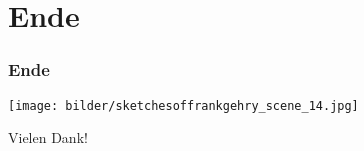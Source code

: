 \documentclass[12pt]{beamer}
\begin{document}
\section{Ende}

\begin{frame}
\frametitle{Ende}
\begin{center}
\texttt{[image: bilder/sketchesoffrankgehry\_scene\_14.jpg]}
\end{center}
Vielen Dank!
\end{frame}








% 
\end{document}
